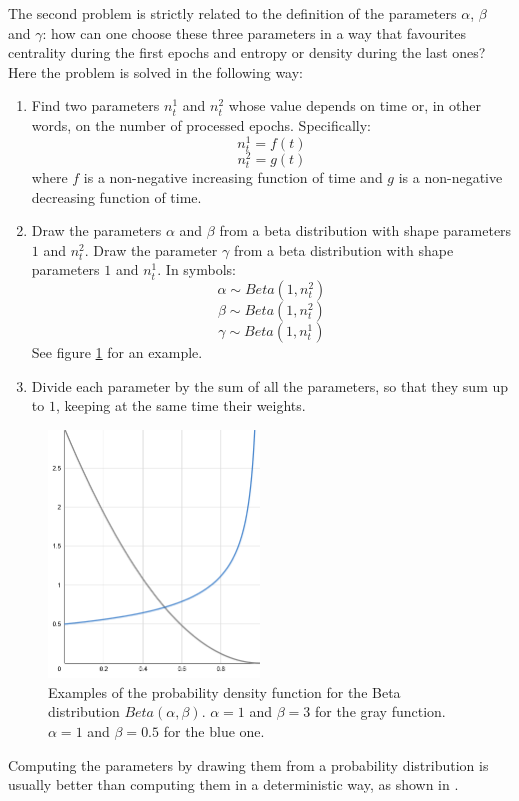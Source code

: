             The second problem is strictly related to the definition of the parameters \(\alpha\), \(\beta\) and \(\gamma\): how can one choose these three parameters in a way that favourites centrality during the first epochs and entropy or density during the last ones? Here the problem is solved in the following way:
            \begin{enumerate}
                \item Find two parameters \(n_t^1\) and \(n_t^2\) whose value depends on time or, in other words, on the number of processed epochs. Specifically:
                \[n_t^1 = f\left(t\right)\]
                \[n_t^2 = g\left(t\right)\]
                where \(f\) is a non-negative increasing function of time and \(g\) is a non-negative decreasing function of time.
                \item Draw the parameters \(\alpha\) and \(\beta\) from a beta distribution with shape parameters \(1\) and \(n_t^2\). Draw the parameter \(\gamma\) from a beta distribution with shape parameters \(1\) and \(n_t^1\). In symbols:
                \[\alpha \sim Beta\left(1,n_t^2\right)\]
                \[\beta \sim Beta\left(1,n_t^2\right)\]
                \[\gamma \sim Beta\left(1,n_t^1\right)\]
                See figure \ref{beta_distribution} for an example.
                \item Divide each parameter by the sum of all the parameters, so that they sum up to \(1\), keeping at the same time their weights.
            \end{enumerate}
            
            \begin{figure}
                \centering
                \includegraphics[width=0.5\textwidth]{images/beta.PNG}
                \caption{Examples of the probability density function for the Beta distribution \(Beta\left(\alpha,\beta\right)\). \(\alpha=1\) and \(\beta=3\) for the gray function. \(\alpha=1\) and \(\beta=0.5\) for the blue one.}
                \label{beta_distribution}
            \end{figure}
            Computing the parameters by drawing them from a probability distribution is usually better than computing them in a deterministic way, as shown in \cite{Cai}.
            
